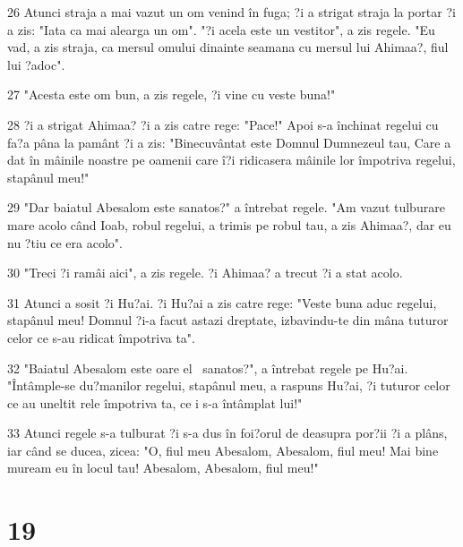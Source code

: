 \par 26 Atunci straja a mai vazut un om venind în fuga; ?i a strigat straja la portar ?i a zis: "Iata ca mai alearga un om". "?i acela este un vestitor", a zis regele. "Eu vad, a zis straja, ca mersul omului dinainte seamana cu mersul lui Ahimaa?, fiul lui ?adoc".
\par 27 "Acesta este om bun, a zis regele, ?i vine cu veste buna!"
\par 28 ?i a strigat Ahimaa? ?i a zis catre rege: "Pace!" Apoi s-a închinat regelui cu fa?a pâna la pamânt ?i a zis: "Binecuvântat este Domnul Dumnezeul tau, Care a dat în mâinile noastre pe oamenii care î?i ridicasera mâinile lor împotriva regelui, stapânul meu!"
\par 29 "Dar baiatul Abesalom este sanatos?" a întrebat regele. "Am vazut tulburare mare acolo când Ioab, robul regelui, a trimis pe robul tau, a zis Ahimaa?, dar eu nu ?tiu ce era acolo".
\par 30 "Treci ?i ramâi aici", a zis regele. ?i Ahimaa? a trecut ?i a stat acolo.
\par 31 Atunci a sosit ?i Hu?ai. ?i Hu?ai a zis catre rege: "Veste buna aduc regelui, stapânul meu! Domnul ?i-a facut astazi dreptate, izbavindu-te din mâna tuturor celor ce s-au ridicat împotriva ta".
\par 32 "Baiatul Abesalom este oare el  sanatos?", a întrebat regele pe Hu?ai. "Întâmple-se du?manilor regelui, stapânul meu, a raspuns Hu?ai, ?i tuturor celor ce au uneltit rele împotriva ta, ce i s-a întâmplat lui!"
\par 33 Atunci regele s-a tulburat ?i s-a dus în foi?orul de deasupra por?ii ?i a plâns, iar când se ducea, zicea: "O, fiul meu Abesalom, Abesalom, fiul meu! Mai bine muream eu în locul tau! Abesalom, Abesalom, fiul meu!"

\chapter{19}

